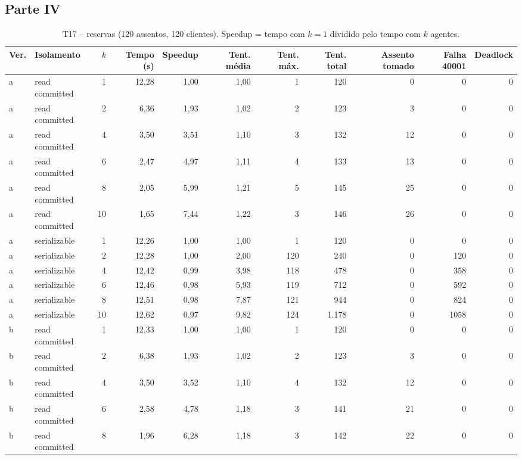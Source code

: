 \documentclass[11pt,a4paper]{article}
\begin{document}
\subsection*{Parte IV}
\begin{table}[H]\centering\small
\caption{T17 -- reservas (120 assentos, 120 clientes). Speedup = tempo com $k=1$ dividido pelo tempo com $k$ agentes.}\label{tab:t17}
\begin{adjustbox}{max width=\linewidth}\begin{tabular}{llrrrrrrrrr}
\toprule
Ver. & Isolamento & $k$ & Tempo (s) & Speedup & Tent. média & Tent. máx. & Tent. total & Assento tomado & Falha 40001 & Deadlock \\
\midrule
a & read committed & 1 & 12,28 & 1,00 & 1,00 & 1 & 120 & 0 & 0 & 0 \\
a & read committed & 2 & 6,36 & 1,93 & 1,02 & 2 & 123 & 3 & 0 & 0 \\
a & read committed & 4 & 3,50 & 3,51 & 1,10 & 3 & 132 & 12 & 0 & 0 \\
a & read committed & 6 & 2,47 & 4,97 & 1,11 & 4 & 133 & 13 & 0 & 0 \\
a & read committed & 8 & 2,05 & 5,99 & 1,21 & 5 & 145 & 25 & 0 & 0 \\
a & read committed & 10 & 1,65 & 7,44 & 1,22 & 3 & 146 & 26 & 0 & 0 \\
a & serializable & 1 & 12,26 & 1,00 & 1,00 & 1 & 120 & 0 & 0 & 0 \\
a & serializable & 2 & 12,28 & 1,00 & 2,00 & 120 & 240 & 0 & 120 & 0 \\
a & serializable & 4 & 12,42 & 0,99 & 3,98 & 118 & 478 & 0 & 358 & 0 \\
a & serializable & 6 & 12,46 & 0,98 & 5,93 & 119 & 712 & 0 & 592 & 0 \\
a & serializable & 8 & 12,51 & 0,98 & 7,87 & 121 & 944 & 0 & 824 & 0 \\
a & serializable & 10 & 12,62 & 0,97 & 9,82 & 124 & 1.178 & 0 & 1058 & 0 \\
b & read committed & 1 & 12,33 & 1,00 & 1,00 & 1 & 120 & 0 & 0 & 0 \\
b & read committed & 2 & 6,38 & 1,93 & 1,02 & 2 & 123 & 3 & 0 & 0 \\
b & read committed & 4 & 3,50 & 3,52 & 1,10 & 4 & 132 & 12 & 0 & 0 \\
b & read committed & 6 & 2,58 & 4,78 & 1,18 & 3 & 141 & 21 & 0 & 0 \\
b & read committed & 8 & 1,96 & 6,28 & 1,18 & 3 & 142 & 22 & 0 & 0 \\

\end{tabular}
\end{adjustbox}
\end{table}
\end{document}
